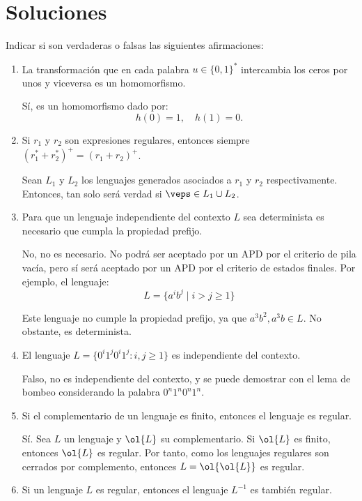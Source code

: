 \documentclass[12pt]{article}
\begin{document}
    \newpage
    \setcounter{ejercicio}{0}
    \section*{Soluciones}

    \begin{ejercicio}[2.5 puntos]
        Indicar si son verdaderas o falsas las siguientes afirmaciones:
        \begin{enumerate}
            \item La transformación que en cada palabra $u \in \{0, 1\}^*$ intercambia los ceros por unos y viceversa es un homomorfismo.
            
            Sí, es un homomorfismo dado por:
            \begin{equation*}
                h(0) = 1, \quad h(1) = 0.
            \end{equation*}
            \item Si $r_1$ y $r_2$ son expresiones regulares, entonces siempre $(r_1^* + r_2^*)^+ = (r_1 + r_2)^+$.
            
            Sean $L_1$ y $L_2$ los lenguajes generados asociados a $r_1$ y $r_2$ respectivamente. Entonces, tan solo será verdad si $\veps\in L_1\cup L_2$.
            \item Para que un lenguaje independiente del contexto $L$ sea determinista es necesario que cumpla la propiedad prefijo.
            
            No, no es necesario. No podrá ser aceptado por un APD por el criterio de pila vacía, pero sí será aceptado por un APD por el criterio de estados finales. Por ejemplo, el lenguaje:
            \begin{equation*}
                L=\{a^ib^j\mid i>j\geq 1\}
            \end{equation*}

            Este lenguaje no cumple la propiedad prefijo, ya que $a^3b^2, a^3b\in L$. No obstante, es determinista.
            \item El lenguaje $L = \{0^{i}1^j0^{i}1^j : i, j \geq 1\}$ es independiente del contexto.
            
            Falso, no es independiente del contexto, y se puede demostrar con el lema de bombeo considerando la palabra $0^{n}1^{n}0^{n}1^{n}$.
            \item Si el complementario de un lenguaje es finito, entonces el lenguaje es regular.
            
            Sí. Sea $L$ un lenguaje y $\ol{L}$ su complementario. Si $\ol{L}$ es finito, entonces $\ol{L}$ es regular. Por tanto, como los lenguajes regulares son cerrados por complemento, entonces $L=\ol{\ol{L}}$ es regular.
            \item Si un lenguaje $L$ es regular, entonces el lenguaje $L^{-1}$ es también regular.
            

\end{enumerate}
\end{ejercicio}
\end{document}
